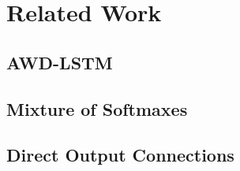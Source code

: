 \chapter{Related Work}
\label{chapter:related_work}

\section{AWD-LSTM}
\label{section:related_work:awd_lstm}

\section{Mixture of Softmaxes}
\label{section:related_work:mos}

\section{Direct Output Connections}
\label{section:related_work:doc}